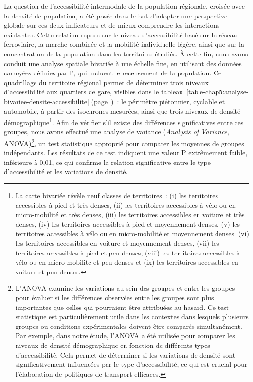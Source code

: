 \begin{refsegment}
La question de l'accessibilité intermodale de la population régionale, croisée avec la densité de population, a été posée dans le but d'adopter une perspective globale sur ces deux indicateurs et de mieux comprendre les interactions existantes. Cette relation repose sur le niveau d'accessibilité basé sur le réseau ferroviaire, la marche combinée et la mobilité individuelle légère, ainsi que sur la concentration de la population dans les territoires étudiés. À cette fin, nous avons conduit une analyse spatiale bivariée à une échelle fine, en utilisant des données carroyées définies par l'\textcolor{blue}{\textcite{insee_grille_2021}}, qui incluent le recensement de la population. Ce quadrillage du territoire régional permet de déterminer trois niveaux d'accessibilité aux quartiers de gare, visibles dans le \hyperref[table-chap5:couverture-spatiale]{tableau~\ref{table-chap5:analyse-bivariee-densite-accessibilite}} (page~\pageref{table-chap5:couverture-spatiale})~: le périmètre piétonnier, cyclable et automobile, à partir des isochrones mesurées, ainsi que trois niveaux de densité démographique\footnote{
    La carte bivariée révèle neuf classes de territoires~: (i) les territoires accessibles à pied et très denses, (ii) les territoires accessibles à vélo ou en micro-mobilité et très denses, (iii) les territoires accessibles en voiture et très denses, (iv) les territoires accessibles à pied et moyennement denses, (v) les territoires accessibles à vélo ou en micro-mobilité et moyennement denses, (vi) les territoires accessibles en voiture et moyennement denses, (vii) les territoires accessibles à pied et peu denses, (viii) les territoires accessibles à vélo ou en micro-mobilité et peu denses et (ix) les territoires accessibles en voiture et peu denses.
}. Afin de vérifier s'il existe des différences significatives entre ces groupes, nous avons effectué une analyse de variance (\textsl{Analysis of Variance}, ANOVA)\footnote{
    L'ANOVA examine les variations au sein des groupes et entre les groupes pour évaluer si les différences observées entre les groupes sont plus importantes que celles qui pourraient être attribuées au hasard. Ce test statistique est particulièrement utile dans les contextes dans lesquels plusieurs groupes ou conditions expérimentales doivent être comparés simultanément. Par exemple, dans notre étude, l'ANOVA a été utilisée pour comparer les niveaux de densité démographique en fonction de différents types d'accessibilité. Cela permet de déterminer si les variations de densité sont significativement influencées par le type d'accessibilité, ce qui est crucial pour l'élaboration de politiques de transport efficaces.
}, un test statistique approprié pour comparer les moyennes de groupes indépendants. Les résultats de ce test indiquent une valeur P extrêmement faible, inférieure à 0,01, ce qui confirme la relation significative entre le type d'accessibilité et les variations de densité.%


\end{refsegment}
